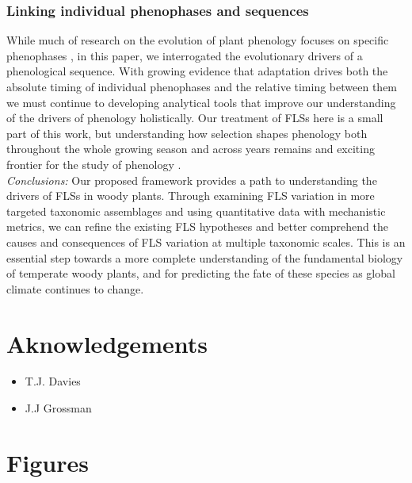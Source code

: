\documentclass{article}
\begin{document}
\subsubsection*{Linking individual phenophases and sequences} %
\noindent While much of research on the evolution of plant phenology focuses on specific phenophases  \citep[e.g.][]{Savage2013,OLLERTON_1992}, in this paper, we interrogated the evolutionary drivers of a phenological sequence. With growing evidence that adaptation drives both the absolute timing of individual phenophases and the relative timing between them we must continue to developing analytical tools that improve our understanding of the drivers of phenology holistically. %
Our treatment of FLSs here is a small part of this work, but understanding how selection shapes phenology both throughout the whole growing season and across years remains and exciting frontier for the study of phenology \citep{Wolkovich2014b}. \\

\noindent \emph{Conclusions:} Our proposed framework provides a path to understanding the drivers of FLSs in woody plants. Through examining FLS variation in more targeted taxonomic assemblages and using quantitative data with mechanistic metrics, we can refine the existing FLS hypotheses and better comprehend the causes and consequences of FLS variation at multiple taxonomic scales. This is an essential step towards a more complete understanding of the fundamental biology of temperate woody plants, and for predicting the fate of these species as global climate continues to change.

\section*{Aknowledgements}
\begin{itemize}
\item T.J. Davies
\item J.J Grossman
\end{itemize}




\section*{Figures}
\end{document}
